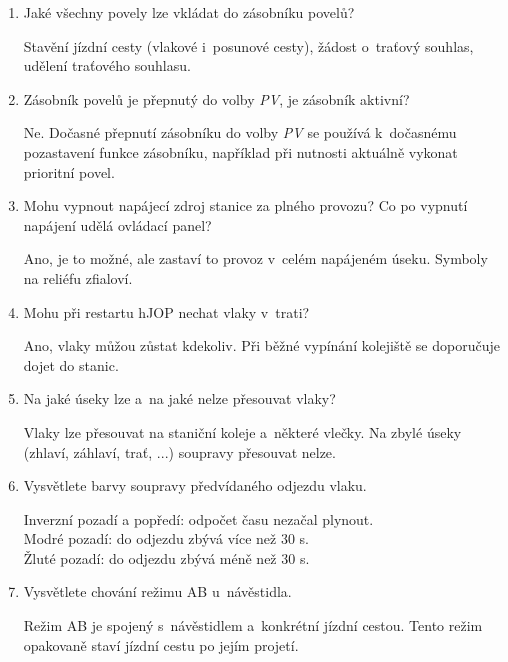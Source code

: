 \documentclass[12pt,a4paper]{article}
\def\solution#1{\ifsolution \par{\color{gray}#1}\fi}
\begin{document}
\begin{enumerate}[leftmargin=*]
\item Jaké všechny povely lze vkládat do zásobníku povelů?
\solution{Stavění jízdní cesty (vlakové i~posunové cesty), žádost o~traťový
souhlas, udělení traťového souhlasu.}

\item Zásobník povelů je přepnutý do volby \textit{PV}, je zásobník aktivní?
\solution{Ne. Dočasné přepnutí zásobníku do volby \textit{PV} se používá
k~dočasnému pozastavení funkce zásobníku, například při nutnosti aktuálně
vykonat prioritní povel.}

\item Mohu vypnout napájecí zdroj stanice za plného provozu? Co po vypnutí
napájení udělá ovládací panel?
\solution{Ano, je to možné, ale zastaví to provoz v~celém napájeném úseku.
Symboly na reliéfu zfialoví.}

\item Mohu při restartu hJOP nechat vlaky v~trati?
\solution{Ano, vlaky můžou zůstat kdekoliv. Při běžné vypínání kolejiště se
doporučuje dojet do stanic.}

\item Na jaké úseky lze a~na jaké nelze přesouvat vlaky?
\solution{Vlaky lze přesouvat na staniční koleje a~některé vlečky. Na zbylé
úseky (zhlaví,  záhlaví, trať, ...) soupravy přesouvat nelze.}

\item Vysvětlete barvy soupravy předvídaného odjezdu vlaku.
\solution{
Inverzní pozadí a popředí: odpočet času nezačal plynout. \\
Modré pozadí: do odjezdu zbývá více než 30 s. \\
Žluté pozadí: do odjezdu zbývá méně než 30 s.}

\item Vysvětlete chování režimu AB u~návěstidla.
\solution{Režim AB je spojený s~návěstidlem a~konkrétní jízdní cestou. Tento
režim opakovaně staví jízdní cestu po jejím projetí.}

\end{enumerate}
\end{document}
